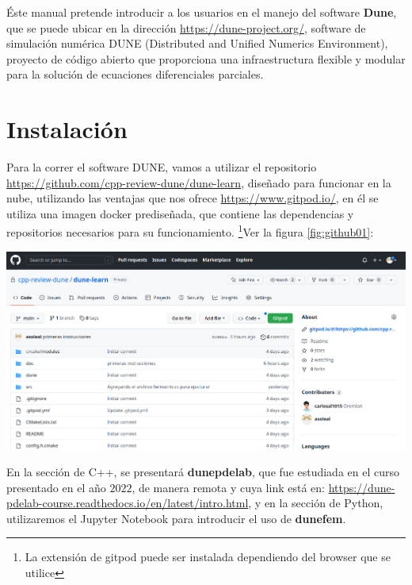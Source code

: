Éste manual pretende introducir a los usuarios en el manejo del software \textbf{Dune}, 
que se puede ubicar en la dirección 
\url{https://dune-project.org/}, software de simulación numérica DUNE (Distributed and Unified Numerics Environment), 
proyecto de código abierto que proporciona una infraestructura flexible y 
modular para la solución de ecuaciones diferenciales parciales.

\section{Instalación}

Para la correr el software DUNE, vamos a utilizar el repositorio \url{https://github.com/cpp-review-dune/dune-learn},
diseñado para funcionar en la nube, utilizando las ventajas que nos ofrece \url{https://www.gitpod.io/}, en él 
se utiliza una imagen docker prediseñada, que contiene las dependencias y repositorios necesarios para su funcionamiento.
\footnote{La extensión de gitpod puede ser instalada dependiendo del browser
que se utilice}Ver la figura \ref{fig:github01}:
\begin{center}\label{fig:github01}
    \includegraphics*[scale=0.3]{cppreview-learn.png}
\end{center}

En la sección de C++, se presentará \textbf{dunepdelab}, que fue estudiada en el curso presentado en el año 
$2022$, de manera remota y cuya link está en: \url{https://dune-pdelab-course.readthedocs.io/en/latest/intro.html},
y en la sección de Python, utilizaremos el Jupyter Notebook para introducir el uso de \textbf{dunefem}.
